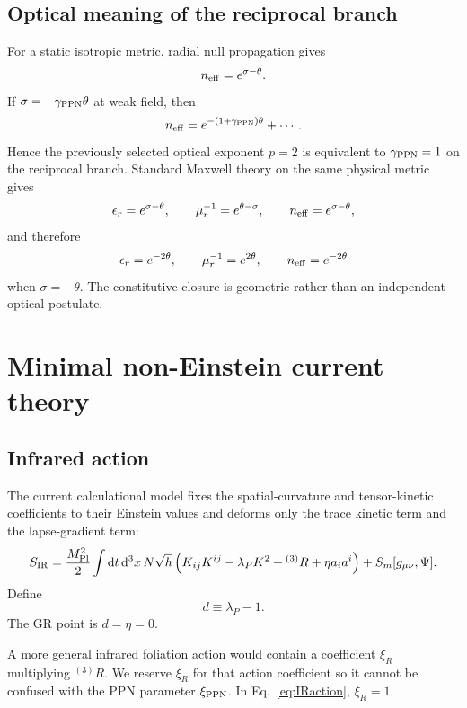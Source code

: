 \documentclass[11pt]{article}
\newcommand{\Mpl}{M_{\rm Pl}}
\newcommand{\dd}{\mathrm{d}}
\newcommand{\Rthree}{{}^{(3)}R}
\newcommand{\gppn}{\gamma_{\rm PPN}}
\begin{document}
\subsection{Optical meaning of the reciprocal branch}

For a static isotropic metric, radial null propagation gives
\begin{equation}
n_{\rm eff}=e^{\sigma-\theta}.
\label{eq:neff}
\end{equation}
If $\sigma=-\gppn\theta$ at weak field, then
\begin{equation}
n_{\rm eff}=e^{-(1+\gppn)\theta}+\cdots.
\end{equation}
Hence the previously selected optical exponent $p=2$ is equivalent to $\gppn=1$ on the reciprocal branch.  Standard Maxwell theory on the same physical metric gives
\begin{equation}
\epsilon_r=e^{\sigma-\theta},\qquad \mu_r^{-1}=e^{\theta-\sigma},\qquad n_{\rm eff}=e^{\sigma-\theta},
\end{equation}
and therefore
\begin{equation}
\epsilon_r=e^{-2\theta},\qquad \mu_r^{-1}=e^{2\theta},\qquad n_{\rm eff}=e^{-2\theta}
\end{equation}
when $\sigma=-\theta$.  The constitutive closure is geometric rather than an independent optical postulate.

\section{Minimal non-Einstein current theory}

\subsection{Infrared action}

The current calculational model fixes the spatial-curvature and tensor-kinetic coefficients to their Einstein values and deforms only the trace kinetic term and the lapse-gradient term:
\begin{equation}
S_{\rm IR}=\frac{\Mpl^2}{2}\int \dd t\,\dd^3x\,N\sqrt h
\left(K_{ij}K^{ij}-\lambda_P K^2+\Rthree+\eta a_i a^i\right)
+S_m[g_{\mu\nu},\Psi].
\label{eq:IRaction}
\end{equation}
Define
\begin{equation}
d\equiv\lambda_P-1.
\label{eq:ddef}
\end{equation}
The GR point is $d=\eta=0$.

A more general infrared foliation action would contain a coefficient $\xi_R$ multiplying $\Rthree$.  We reserve $\xi_R$ for that action coefficient so it cannot be confused with the PPN parameter $\xi_{\rm PPN}$.  In Eq.~\eqref{eq:IRaction}, $\xi_R=1$.
\end{document}
